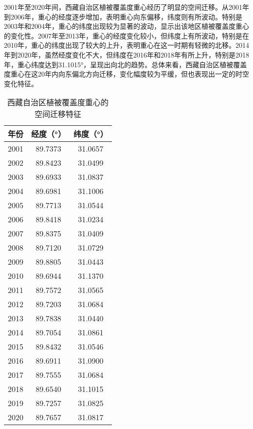 \documentclass[AutoFakeBold]{LZUThesis-PgD&PhD}
\begin{document}
    2001年至2020年间，西藏自治区植被覆盖度重心经历了明显的空间迁移。从2001年到2006年，重心的经度逐步增加，表明重心向东偏移，纬度则有所波动。特别是2003年和2004年，重心的纬度出现较为显著的波动，显示出该地区植被覆盖度重心的变化性。2007年至2013年，重心的经度变化较小，但纬度上有所波动，特别是在2010年，重心的纬度出现了较大的上升，表明重心在这一时期有轻微的北移。2014年到2020年，虽然经度变化不大，但纬度在2016年和2018年有所上升，特别是2018年，重心纬度达到31.1015°，呈现出向北的趋势。总体来看，西藏自治区植被覆盖度重心在这20年内向东偏北方向迁移，变化幅度较为平缓，但也表现出一定的时空变化特征。
    
    \begin{table}[H]
        \centering
        \begin{tabular}{|c|c|c|}
            \hline
            年份 & 经度（°） & 纬度（°） \\
            \hline
            2001 & 89.7373 & 31.0657 \\
            2002 & 89.8423 & 31.0499 \\
            2003 & 89.6933 & 31.0837 \\
            2004 & 89.6981 & 31.1006 \\
            2005 & 89.7713 & 31.0544 \\
            2006 & 89.8418 & 31.0234 \\
            2007 & 89.8375 & 31.0409 \\
            2008 & 89.7120 & 31.0729 \\
            2009 & 89.8805 & 31.0443 \\
            2010 & 89.6944 & 31.1370 \\
            2011 & 89.7572 & 31.0565 \\
            2012 & 89.7203 & 31.0684 \\
            2013 & 89.7838 & 31.0440 \\
            2014 & 89.7054 & 31.0861 \\
            2015 & 89.8432 & 31.0546 \\
            2016 & 89.6911 & 31.0900 \\
            2017 & 89.7555 & 31.0684 \\
            2018 & 89.6540 & 31.1015 \\
            2019 & 89.7257 & 31.0825 \\
            2020 & 89.7657 & 31.0817 \\
            \hline
        \end{tabular}
        \caption{西藏自治区植被覆盖度重心的空间迁移特征}
    \end{table}
\end{document}
